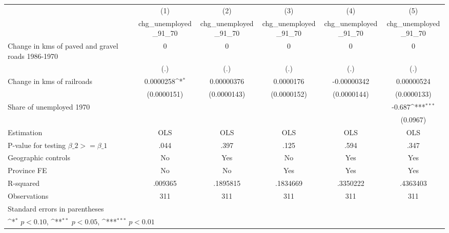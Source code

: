 {
\def\sym#1{\ifmmode^{#1}\else\(^{#1}\)\fi}
\begin{tabular}{l*{5}{c}}
\hline\hline
                    &\multicolumn{1}{c}{(1)}&\multicolumn{1}{c}{(2)}&\multicolumn{1}{c}{(3)}&\multicolumn{1}{c}{(4)}&\multicolumn{1}{c}{(5)}\\
                    &\multicolumn{1}{c}{chg\_unemployed\_91\_70}&\multicolumn{1}{c}{chg\_unemployed\_91\_70}&\multicolumn{1}{c}{chg\_unemployed\_91\_70}&\multicolumn{1}{c}{chg\_unemployed\_91\_70}&\multicolumn{1}{c}{chg\_unemployed\_91\_70}\\
\hline
Change in kms of paved and gravel roads 1986-1970&           0         &           0         &           0         &           0         &           0         \\
                    &         (.)         &         (.)         &         (.)         &         (.)         &         (.)         \\
[1em]
Change in kms of railroads&   0.0000258\sym{*}  &  0.00000376         &   0.0000176         & -0.00000342         &  0.00000524         \\
                    & (0.0000151)         & (0.0000143)         & (0.0000152)         & (0.0000144)         & (0.0000133)         \\
[1em]
Share of unemployed 1970&                     &                     &                     &                     &      -0.687\sym{***}\\
                    &                     &                     &                     &                     &    (0.0967)         \\
\hline
Estimation          &         OLS         &         OLS         &         OLS         &         OLS         &         OLS         \\
P-value for testing $\beta\_2 >= \beta\_1$&        .044         &        .397         &        .125         &        .594         &        .347         \\
Geographic controls &          No         &         Yes         &          No         &         Yes         &         Yes         \\
Province FE         &          No         &          No         &         Yes         &         Yes         &         Yes         \\
R-squared           &     .009365         &    .1895815         &    .1834669         &    .3350222         &    .4363403         \\
Observations        &         311         &         311         &         311         &         311         &         311         \\
\hline\hline
\multicolumn{6}{l}{\footnotesize Standard errors in parentheses}\\
\multicolumn{6}{l}{\footnotesize \sym{*} \(p<0.10\), \sym{**} \(p<0.05\), \sym{***} \(p<0.01\)}\\
\end{tabular}
}
